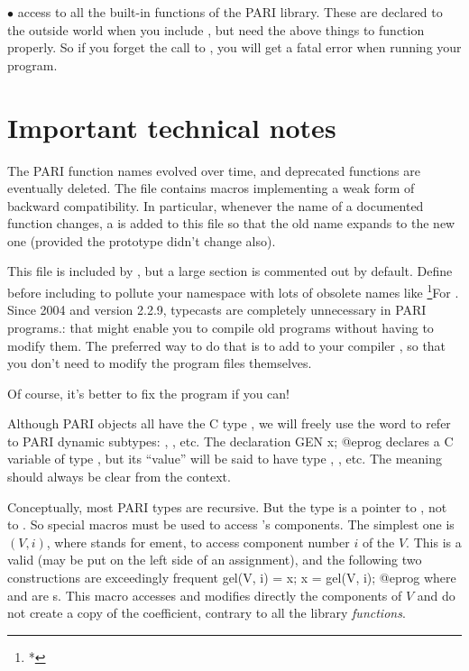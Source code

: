 $\bullet$ access to all the built-in functions of the PARI library.
These are declared to the outside world when you include , but
need the above things to function properly. So if you forget the call to
, you will get a fatal error when running your program.

\section{Important technical notes}

 The PARI function names evolved over time,
and deprecated functions are eventually deleted.  The file 
contains macros implementing a weak form of backward compatibility.
In particular, whenever the name of a documented function changes, a
 is added to this file so that the old name expands to the new
one (provided the prototype didn't change also).

This file is included by , but a large section is commented out
by default. Define  before including  to
pollute your namespace with lots of obsolete names like
\footnote{*}{For . Since 2004 and version 2.2.9,
typecasts are completely unnecessary in PARI programs.}: that might enable
you to compile old programs without having to modify them. The preferred way
to do that is to add  to your compiler ,
so that you don't need to modify the program files themselves.

Of course, it's better to fix the program if you can!


\noindent
Although PARI objects all have the C type , we will freely use
the word  to refer to PARI dynamic subtypes: , ,
etc. The declaration
\bprog
  GEN x;
@eprog\noindent
declares a C variable of type , but its ``value'' will be said to
have type , , etc. The meaning should always be clear from
the context.


\noindent
Conceptually, most PARI types are recursive. But the  type is a
pointer to , not to . So special macros must be used to
access 's components. The simplest one is $(V, i)$, where
 stands for ement, to access component number $i$ of the
 $V$. This is a valid  (may be put on the left side of
an assignment), and the following two constructions are exceedingly frequent
%
\bprog
  gel(V, i) = x;
  x = gel(V, i);
@eprog\noindent
where  and  are s. This macro accesses and modifies
directly the components of $V$ and do not create a copy of the coefficient,
contrary to all the library \emph{functions}.

